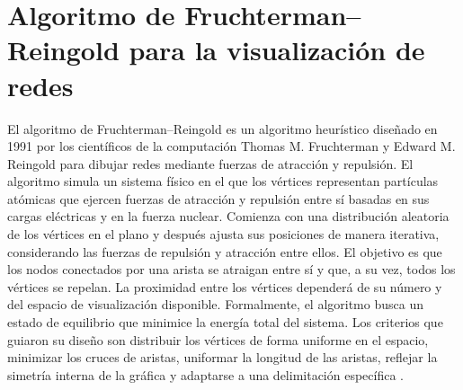 \chapter{Algoritmo de Fruchterman--Reingold para la visualización de redes}\label{anexo5}

El algoritmo de Fruchterman--Reingold es un algoritmo heurístico diseñado en 1991 por los científicos de la computación Thomas M. Fruchterman y Edward M. Reingold para dibujar redes mediante fuerzas de atracción y repulsión. El algoritmo simula un sistema físico en el que los vértices representan partículas atómicas que ejercen fuerzas de atracción y repulsión entre sí basadas en sus cargas eléctricas y en la fuerza nuclear. Comienza con una distribución aleatoria de los vértices en el plano y después ajusta sus posiciones de manera iterativa, considerando las fuerzas de repulsión y atracción entre ellos. El objetivo es que los nodos conectados por una arista se atraigan entre sí y que, a su vez, todos los vértices se repelan. La proximidad entre los vértices dependerá de su número y del espacio de visualización disponible. Formalmente, el algoritmo busca un estado de equilibrio que minimice la energía total del sistema. Los criterios que guiaron su diseño son distribuir los vértices de forma uniforme en el espacio, minimizar los cruces de aristas, uniformar la longitud de las aristas, reflejar la simetría interna de la gráfica y adaptarse a una delimitación específica \parencite{Fruchterman1991}.  